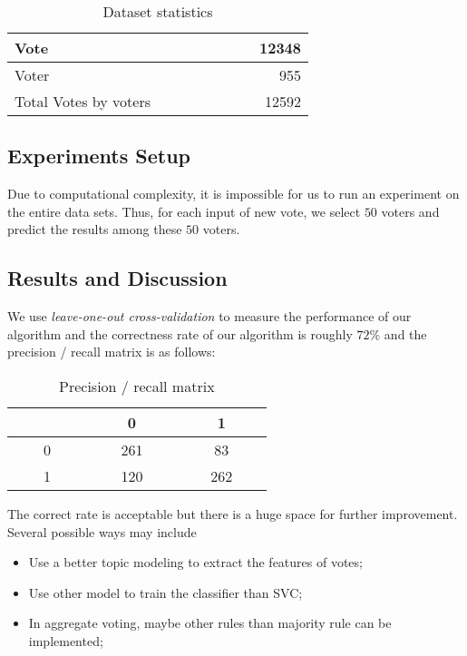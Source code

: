 \documentclass{article} %
\begin{document}
     \begin{table}[htbp]
         \centering
         \begin{tabular}{|l|r|}
             \hline
             Vote & 12348 \\
             \hline
             Voter & 955 \\
             \hline
             Total Votes by voters~~~~~~~~~~~~~ & 12592 \\ 
             \hline
         \end{tabular}
         \caption{Dataset statistics}
     \end{table}

\subsection{Experiments Setup}
    
    Due to computational complexity, it is impossible for us to run an experiment on the entire data sets. Thus, for each input of new vote, we select $50$ voters and predict the results among these $50$ voters. 

\subsection{Results and Discussion}
    We use {\em leave-one-out cross-validation} to measure the performance of our algorithm and the correctness rate of our algorithm is roughly $72\%$ and the precision / recall matrix is as follows:
    
    \begin{table}[htbp]
        \centering
        \begin{tabular}{|c|c|c|}
            \hline
              & ~~~~0~~~~ & ~~~~1~~~~ \\
            \hline
            ~~~~0~~~~ & 261 & 83 \\
            \hline
            ~~~~1~~~~ & 120 & 262 \\
            \hline
        \end{tabular}
        \caption{Precision / recall matrix}
    \end{table}
    
    
    The correct rate is acceptable but there is a huge space for further improvement. Several possible ways may include
    \begin{itemize}
        \item Use a better topic modeling to extract the features of votes;
        \item Use other model to train the classifier than SVC;
        \item In aggregate voting, maybe other rules than majority rule can be implemented;
    \end{itemize}
    
\end{document}
